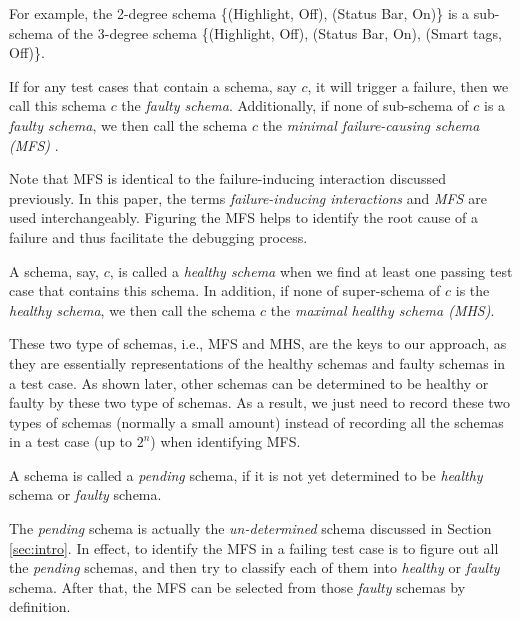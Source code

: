 \documentclass{sig-alternate-05-2015}
\begin{document}
For example,  the 2-degree schema \{(Highlight, Off), (Status Bar, On)\} is a sub-schema of the 3-degree schema \{(Highlight, Off), (Status Bar, On), (Smart tags, Off)\}.

\begin{definition} \label{de:faulty:minimal}
If for any test cases that contain a schema, say $c$, it will trigger a failure, then we call this schema $c$ the \emph{faulty schema}. Additionally, if none of sub-schema of $c$ is a \emph{faulty schema}, we then call the schema $c$ the \emph{minimal failure-causing schema (MFS)} \cite{nie2011minimal}.

\end{definition}

Note that MFS is identical to the failure-inducing interaction discussed previously. In this paper, the terms \emph{failure-inducing interactions} and \emph{MFS} are used interchangeably. Figuring the MFS helps to identify the root cause of a failure and thus facilitate the debugging process.


\begin{definition}\label{de:healthy:maximal}
A schema, say, $c$, is called a \emph{healthy schema} when we find at least one passing test case that contains this schema. In addition, if none of super-schema of $c$ is the \emph{healthy schema}, we then call the schema $c$ the \emph{maximal healthy schema (MHS)}.
\end{definition}

These two type of schemas, i.e., MFS and MHS, are the keys to our approach, as they are essentially representations of the healthy schemas and faulty schemas in a test case. As shown later, other schemas can be determined to be healthy or faulty by these two type of schemas. As a result, we just need to record these two types of schemas (normally a small amount) instead of recording all the schemas in a test case (up to $2^{n}$) when identifying MFS.


\begin{definition}\label{de:pending}
A schema is called a \emph{pending} schema, if it is not yet determined to be \emph{healthy} schema or \emph{faulty} schema.
\end{definition}

The \emph{pending} schema is actually the \emph{un-determined} schema discussed in Section \ref{sec:intro}. In effect, to identify the MFS in a failing test case is to figure out all the \emph{pending} schemas, and then try to classify each of them into \emph{healthy} or \emph{faulty} schema. After that, the MFS can be selected from those \emph{faulty} schemas by definition.
\end{document}
